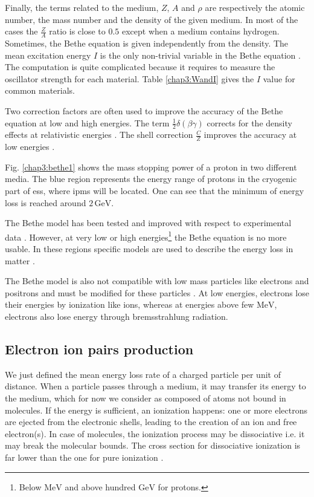 \begin{refsection}
  Finally, the terms related to the medium, \(Z\), \(A\) and \(\rho\) are respectively the atomic number, the mass number and the density of the given medium. In most of the cases the \(\frac{Z}{A}\) ratio is close to \(0.5\) except when a medium contains hydrogen. Sometimes, the Bethe equation is given independently from the density.
  The mean excitation energy \(I\) is the only non-trivial variable in the Bethe equation \cite{Berger1984,Berger1993}. The computation is quite complicated because it requires to measure the oscillator strength for each material. Table \ref{chap3:WandI} gives the \(I\) value for common materials.

  Two correction factors are often used to improve the accuracy of the Bethe equation at low and high energies. The term \(\frac{1}{2}\delta(\beta \gamma)\) corrects for the density effects at relativistic energies \cite{Sternheimer1984}. The shell correction \(\frac{C}{Z}\) improves the accuracy at low energies \cite{Bichsel2002}.

  

  Fig. \ref{chap3:bethe1} shows the mass stopping power of a proton in two different media. The blue region represents the energy range of protons in the cryogenic part of \acrshort{ess}, where \acrshort{ipm}s will be located. One can see that the minimum of energy loss is reached around \(2\,\mathrm{GeV}\).

  The Bethe model has been tested and improved with respect to experimental data \cite{Porter1990}. However, at very low or high energies\footnote{Below $\mathrm{MeV}$ and above hundred $\mathrm{GeV}$ for protons.} the Bethe equation is no more usable. In these regions specific models are used to describe the energy loss in matter \cite{Ziegler1985, Allison1980}.

  The Bethe model is also not compatible with low mass particles like electrons and positrons and must be modified for these particles \cite{Rieke1972}\cite[p. 452]{Tanabashi2018}. At low energies, electrons lose their energies by ionization like ions, whereas at energies above few \(\mathrm{MeV}\), electrons also lose energy through bremsstrahlung radiation.

  \subsection{Electron ion pairs production}
  We just defined the mean energy loss rate of a charged particle per unit of distance. When a particle passes through a medium, it may transfer its energy to the medium, which for now we consider as composed of atoms not bound in molecules. If the energy is sufficient, an ionization happens: one or more electrons are ejected from the electronic shells, leading to the creation of an ion and free electron(s). In case of molecules, the ionization process may be dissociative i.e. it may break the molecular bounds. The cross section for dissociative ionization is far lower than the one for pure ionization \cite{Dimopoulou2004}.


\end{refsection}
